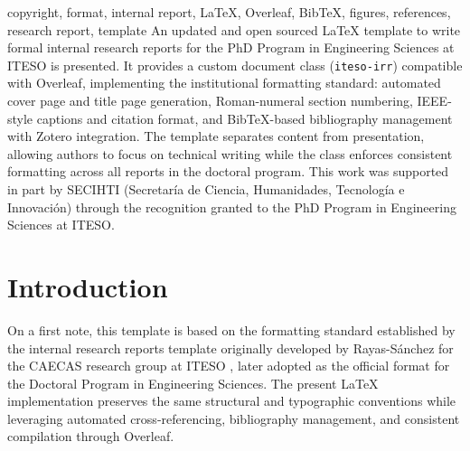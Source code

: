 \documentclass{iteso-irr}
\begin{document}

\makecoverpage


\setcounter{page}{1}

\makefirstpage
{%
  copyright, format, internal report, \LaTeX{}, Overleaf, BibTeX,
  figures, references, research report, template%
}
{%
  An updated and open sourced \LaTeX{} template to write formal internal
  research reports for the PhD Program in Engineering Sciences at ITESO
  is presented. It provides a custom document class (\texttt{iteso-irr})
  compatible with Overleaf, implementing the institutional formatting
  standard: automated cover page and title page generation, Roman-numeral
  section numbering, IEEE-style captions and citation format, and
  BibTeX-based bibliography management with Zotero integration. The
  template separates content from presentation, allowing authors to focus
  on technical writing while the class enforces consistent formatting
  across all reports in the doctoral program.%
}
{%
  This work was supported in part by SECIHTI (Secretar\'{i}a de Ciencia,
  Humanidades, Tecnolog\'{i}a e Innovaci\'{o}n) through the recognition
  granted to the PhD Program in Engineering Sciences at ITESO.%
}


\section{Introduction}
\label{sec:introduction}

On a first note, this template is based on the formatting standard established by the
internal research reports template originally developed by
Rayas-S\'{a}nchez for the CAECAS research group at ITESO
\cite{ref:rayas2015word}, later adopted as the official format for the
Doctoral Program in Engineering Sciences. The present \LaTeX{}
implementation preserves the same structural and typographic conventions
while leveraging automated cross-referencing, bibliography management,
and consistent compilation through Overleaf.
\end{document}
